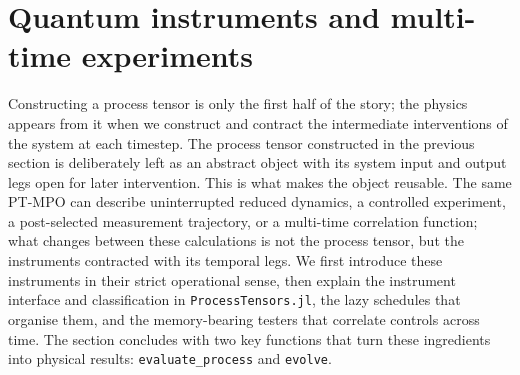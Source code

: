 \section{Quantum instruments and multi-time experiments}
\label{sec:quantum-instruments}

Constructing a process tensor is only the first half of the story; the physics appears from it when we construct and contract the intermediate interventions of the system at each timestep.
The process tensor constructed in the previous section is deliberately left as an abstract object with its system input and output legs open for later intervention.
This is what makes the object reusable.
The same PT-MPO can describe uninterrupted reduced dynamics, a controlled experiment, a post-selected measurement trajectory, or a multi-time correlation function; what changes between these calculations is not the process tensor, but the instruments contracted with its temporal legs.
We first introduce these instruments in their strict operational sense, then explain the instrument interface and classification in \texttt{ProcessTensors.jl}, the lazy schedules that organise them, and the memory-bearing testers that correlate controls across time.
The section concludes with two key functions that turn these ingredients into physical results: \texttt{evaluate\_process} and \texttt{evolve}.

\label{subsec:instrument-operational-meaning}

